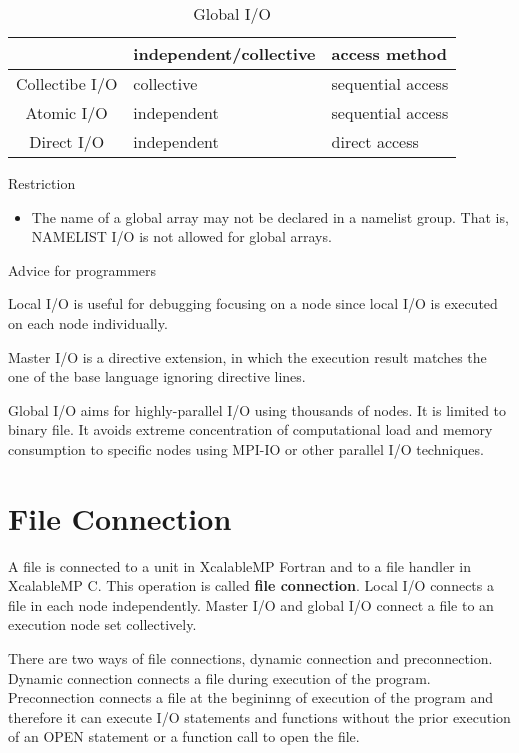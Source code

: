   \begin{table}[tb]
   \begin{center}
    \caption{Global I/O}
    \label{tb:global}
    \begin{tabular}{|c||l|l|}
     \hline 
     & independent/collective & access method  \\ \hline \hline
     Collectibe I/O & collective & sequential access \\ \hline
     Atomic I/O & independent & sequential access \\ \hline
     Direct I/O & independent & direct access \\ \hline
    \end{tabular}
   \end{center}
  \end{table}
  
  Restriction

  \begin{itemize}
   \item  The name of a global array may not be declared in a namelist
	  group.
	  That is, NAMELIST I/O is not allowed for global arrays.
  \end{itemize}

  Advice for programmers

  Local I/O is useful for debugging focusing on a node since local I/O
  is executed on each node individually.

  Master I/O is a directive extension, in which the execution result
  matches the one of the base language ignoring directive lines.

  Global I/O aims for highly-parallel I/O using thousands of nodes.
  It is limited to binary file.
  It avoids extreme concentration of computational load and memory
  consumption to specific nodes using MPI-IO or other parallel I/O
  techniques.

  \section{File Connection}

  A file is connected to a unit in XcalableMP Fortran and to a file
  handler in XcalableMP C.
  This operation is called {\bf file connection}.
  Local I/O connects a file in each node independently.
  Master I/O and global I/O connect a file to an execution node set
  collectively.
  
  There are two ways of file connections, dynamic connection and
  preconnection.
  Dynamic connection connects a file during execution of the program.
  Preconnection connects a file at the begininng of execution of the
  program and therefore it can execute I/O statements and functions
  without the prior execution of an OPEN statement or a function call to
  open the file.

